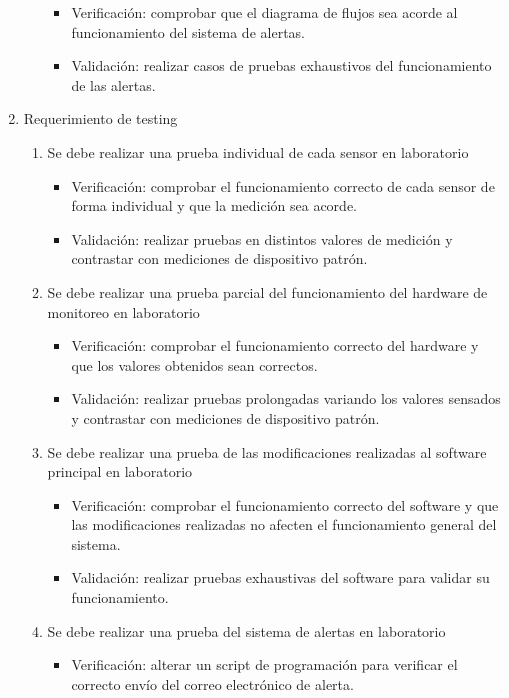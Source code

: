 \documentclass[
11pt, %
]{charter}
\begin{document}
\begin{enumerate}
\begin{enumerate}
			\begin{itemize}
				\item Verificación: comprobar que el diagrama de flujos sea acorde al funcionamiento del sistema de alertas.
				\item Validación: realizar casos de pruebas exhaustivos del funcionamiento de las alertas.
			\end{itemize}
		\end{enumerate}
	\item Requerimiento de testing
		\begin{enumerate}		
			\item Se debe realizar una prueba individual de cada sensor en laboratorio
			\begin{itemize}
				\item Verificación: comprobar el funcionamiento correcto de cada sensor de forma individual y que la medición sea acorde.
				\item Validación: realizar pruebas en distintos valores de medición y contrastar con mediciones de dispositivo patrón.
			\end{itemize}
			\item Se debe realizar una prueba parcial del funcionamiento del hardware de monitoreo en laboratorio
			\begin{itemize}
				\item Verificación: comprobar el funcionamiento correcto del hardware y que los valores obtenidos sean correctos.
				\item Validación: realizar pruebas prolongadas variando los valores sensados y contrastar con mediciones de dispositivo patrón.
			\end{itemize}
			\item Se debe realizar una prueba de las modificaciones realizadas al software principal en laboratorio
			\begin{itemize}
				\item Verificación: comprobar el funcionamiento correcto del software y que las modificaciones realizadas no afecten el funcionamiento general del sistema.
				\item Validación: realizar pruebas exhaustivas del software para validar su funcionamiento.
			\end{itemize}
			\item Se debe realizar una prueba del sistema de alertas en laboratorio
			\begin{itemize}
				\item Verificación: alterar un script de programación para verificar el correcto envío del correo electrónico de alerta.

\end{itemize}
\end{enumerate}
\end{enumerate}
\end{document}
